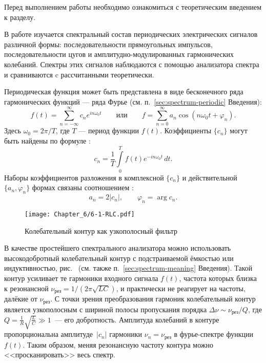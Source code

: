 

Перед выполнением работы необходимо ознакомиться с теоретическим введением
к разделу.

В работе изучается спектральный состав периодических электрических сигналов
различной формы: последовательности прямоугольных импульсов, последовательности
цугов и амплитудно-модулированных гармонических колебаний. Спектры этих сигналов
наблюдаются с помощью анализатора спектра и сравниваются c рассчитанными
теоретически.

Периодическая функция может быть представлена в виде бесконечного ряда
гармонических функций --- ряда Фурье (см. п.~\ref{sec:spectrum-periodic}
Введения):
\[
f(t) = \sum_{n=-\infty}^{\infty} c_n e^{in\omega_0 t}\qquad\text{или}\qquad
f=\sum_{n=0}^{\infty} a_n \cos (n\omega_0 t + \varphi_n).
\]
Здесь $\omega_0 = 2\pi/T$, где $T$ --- период функции $f(t)$.
Коэффициенты $\{c_n\}$ могут быть найдены по формуле
:
\[
    c_n=\frac{1}{T}\int\limits_{0}^{T} f(t)e^{-in\omega_0 t}\,dt.
\]
Наборы коэффициентов разложения в комплексной $\{c_n\}$ и действительной
$\{a_n,\varphi_n\}$ формах связаны соотношением :
\[
a_n = 2|c_n|,\qquad \varphi_n = \arg c_n.
\]

\begin{wrapfigure}{o}{0.3\textwidth}
\centering\texttt{[image: Chapter\_6/6-1-RLC.pdf]}
\caption{Колебательный контур как узкополосный фильтр}
\end{wrapfigure}

В качестве простейшего спектрального анализатора можно использовать
высокодобротный колебательный контур с подстраиваемой ёмкостью или
индуктивностью, рис.~
(см. также п.~\ref{sec:spectrum-meaning} Введения).
Такой контур усиливает те гармоники входного сигнала $f(t)$,
частота которых близка к резонансной
$\nu_{рез} = 1/(2\pi\sqrt{LC})$, и практически не реагирует на частоты,
далёкие от $\nu_{рез}$. С точки зрения преобразования гармоник колебательный контур
является узкополосным  с шириной полосы
пропускания порядка $\Delta \nu \sim \nu_{рез}/ Q$, где $Q =
\frac{1}{R}\sqrt{\frac{L}{C}} \gg 1$~--- его добротность. Амплитуда колебаний
в контуре пропорциональна амплитуде~$|c_n|$ гармоники $\nu_n=\nu_{рез}$
в фурье-спектре функции $f(t)$. Таким образом, меняя резонансную частоту контура
можно <<просканировать>> весь спектр.

